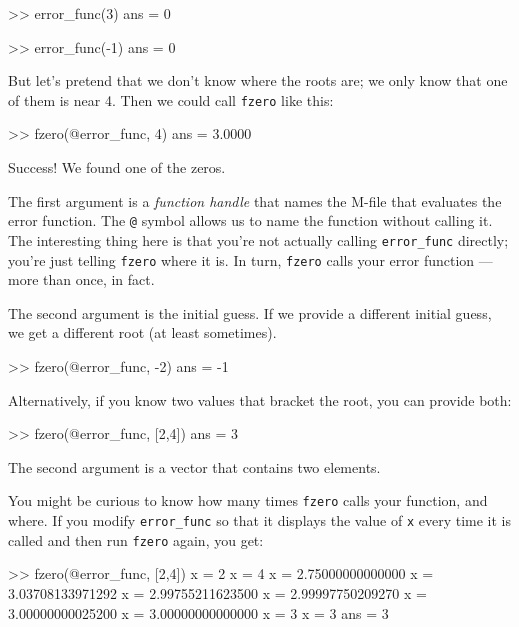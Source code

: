 \begin{code}
>> error_func(3)
ans = 0

>> error_func(-1)
ans = 0
\end{code}

But let's pretend that we don't know where
the roots are; we only know that one of them is near 4.  Then
we could call {\tt fzero} like this:

\begin{code}
>> fzero(@error_func, 4)
ans = 3.0000
\end{code}

Success!  We found one of the zeros.

The first argument is a
{\em function handle} that names the M-file that evaluates
the error function.  The {\tt @} symbol allows us to name the
function without calling it.  The interesting thing here is
that you're not actually calling {\tt error\_func} directly;
you're just telling {\tt fzero} where it is.  In turn, {\tt fzero}
calls your error function --- more than once, in fact.


The second argument is the initial guess.  If we provide a different
initial guess, we get a different root (at least sometimes).

\begin{code}
>> fzero(@error_func, -2)
ans = -1
\end{code}

Alternatively, if you know two values that bracket the root,
you can provide both:

\begin{code}
>> fzero(@error_func, [2,4])
ans = 3
\end{code}

The second argument is a vector that contains two elements.  


You might be curious to know how many times {\tt fzero} calls your
function, and where.  If you modify {\tt error\_func} so that it displays
the value of {\tt x} every time it is called and then run {\tt fzero}
again, you get:

\begin{code}
>> fzero(@error_func, [2,4])
x = 2
x = 4
x = 2.75000000000000
x = 3.03708133971292
x = 2.99755211623500
x = 2.99997750209270
x = 3.00000000025200
x = 3.00000000000000
x = 3
x = 3
ans = 3
\end{code}

